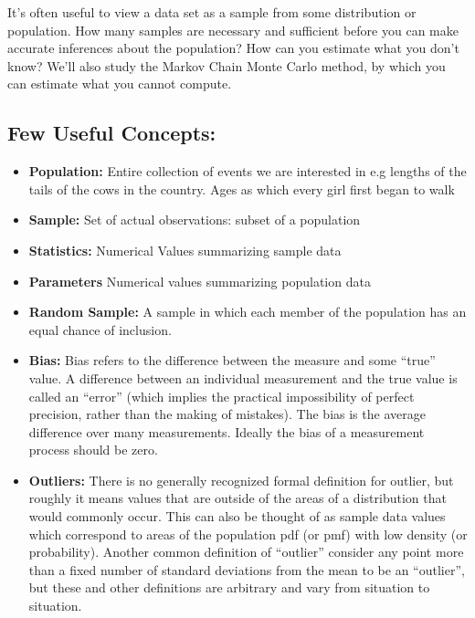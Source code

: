 \documentclass[openany]{book}
\begin{document}
It’s often useful to view a data set as a sample from some
distribution or population. How many samples are necessary and sufficient before you can make accurate inferences about the population? How can you estimate what you
don’t know? We’ll also study the Markov Chain Monte Carlo method, by which you can estimate what you cannot compute.

\subsection{Few Useful Concepts:}

\begin{itemize}
    \item \textbf{Population:} Entire collection of events we are interested in e.g lengths of the tails of the cows in the country. Ages as which every girl first began to walk
    
    \item \textbf{Sample:} Set of actual observations: subset of a population
    
    \item \textbf{Statistics:} Numerical Values summarizing sample data
    
    \item \textbf{Parameters} Numerical values summarizing population data
    
    \item \textbf{Random Sample:} A sample in which each member of the population has an equal chance of inclusion. 

    \item \textbf{Bias:} Bias refers to the difference between the measure and some “true” value. A difference between an individual measurement and the true value is called an “error” (which implies the practical impossibility of perfect precision, rather than the making of mistakes). The bias is the average difference over many measurements. Ideally the bias of a measurement process should be zero. 

    \item \textbf{Outliers:} There is no generally recognized formal definition for outlier, but roughly it means values that are outside of the areas of a distribution that would commonly occur. This can also be thought of as sample data values which correspond to areas of the population pdf (or pmf) with low density (or probability). Another common definition of “outlier” consider any point more than a fixed number of standard deviations from the mean to be an “outlier”, but these and other definitions are arbitrary and vary from situation to situation.

\end{itemize}
\end{document}
